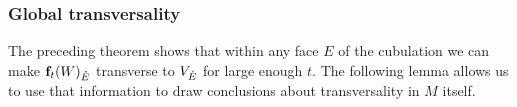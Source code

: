 \begin{comment}

	AROUND HERE IS WHERE THINGS STILL NEED TO BE FIXED UP.

	Similarly, consider a $\zeta > 0$ small enough so that the closed $L^\infty$ neighborhood $\overline N_\zeta(F^-)$ of $F^-$ is such that either $W_E \cap \overline N_\zeta(F^-) = \emptyset$ or for any $x \in W_E \cap \overline N_\zeta(F^-)$ the affine space $T_xW_E$ is transverse to the span of $\beta_{F^-} = \{\e_i\ |\ i \in F^-_{01}\}$ at $x$.
	In the latter case, for every such $x$, the transversality implies that $T_xW_E$ projects surjectively onto $F$; in other words, the projection of $W_E \cap \overline N_\zeta(F^-)$ to $F$ is a submersion onto its image.
	Therefore, we may choose continuously with $x$ a subset of $T_xW_E$ of the form $\beta_x = \{\e_j + v_j\ |\ j \in F_{01}\}$ such that $v_j$ is in the span of $\beta_{F^-}$.
	As $W_E \cap \overline N_\zeta(F^-)$ is compact, the $v_j$ have bounded norm.

	By possibly making $\delta$ smaller we can choose $u \in (0, 1)$ by inductive hypothesis such that $\overline N_\delta(F) \setminus \overline N_\delta L_u(F)$ is contained in $\mathcal N^{i-1}$.

	By \cref{L:flow to initial and terminal faces} we may choose $t > T^{i-1}$ sufficiently large so that all points in $\f_t(W_E) \cap V_E \cap \overline N_\delta L_u(F)$ are of the form $y = \f_t(x)$ for some $x \in W_E \cap \overline N_\zeta(F^-)$.

	We use \cref{L:jacobian ratios} to deduce that the push forward of the span of $\beta_x$ along $D\,\f_t$ is as close as desired to the span of $\beta_F$ at $y$ and is therefore transverse to $T_y V_E$.
	The induction step is completed by taking $\mathcal N^i$ to be the union over all terminal faces of $N_\delta(F)$ and $T^i$ the maximum value of their associated $t$.

\end{comment}

\subsubsection{Global transversality}

The preceding theorem shows that within any face $E$ of the cubulation we can make $\mathbf{f}_t(W)_{\mathring{E}}$ transverse to $V_{\mathring{E}}$ for large enough $t$.
The following lemma allows us to use that information to draw conclusions about transversality in $M$ itself.

